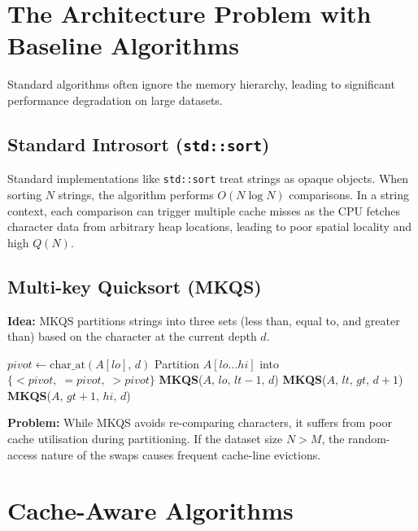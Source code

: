 \documentclass{article}
\begin{document}
\section{The Architecture Problem with Baseline Algorithms}

Standard algorithms often ignore the memory hierarchy, leading to significant
performance degradation on large datasets.

\subsection{Standard Introsort (\texttt{std::sort})}

Standard implementations like \texttt{std::sort} treat strings as opaque objects.
When sorting $N$ strings, the algorithm performs $O(N \log N)$ comparisons.
In a string context, each comparison can trigger multiple cache misses as the CPU
fetches character data from arbitrary heap locations, leading to poor spatial
locality and high $Q(N)$.

\subsection{Multi-key Quicksort (MKQS)}

\textbf{Idea:} MKQS partitions strings into three sets (less than, equal to, and
greater than) based on the character at the current depth $d$.

\begin{algorithm}
\caption{Multi-key Quicksort ($A,\,lo,\,hi,\,d$)}
\begin{algorithmic}[1]
 \Return \EndIf
\State $pivot \gets \text{char\_at}(A[lo],\,d)$
\State Partition $A[lo \ldots hi]$ into $\{< pivot,\;= pivot,\;> pivot\}$
\State \textbf{MKQS}($A,\,lo,\,lt-1,\,d$)
\State \textbf{MKQS}($A,\,lt,\,gt,\,d+1$) 
\State \textbf{MKQS}($A,\,gt+1,\,hi,\,d$)
\end{algorithmic}
\end{algorithm}

\textbf{Problem:} While MKQS avoids re-comparing characters, it suffers from poor
cache utilisation during partitioning.  If the dataset size $N > M$, the
random-access nature of the swaps causes frequent cache-line evictions.

\section{Cache-Aware Algorithms}
\end{document}

